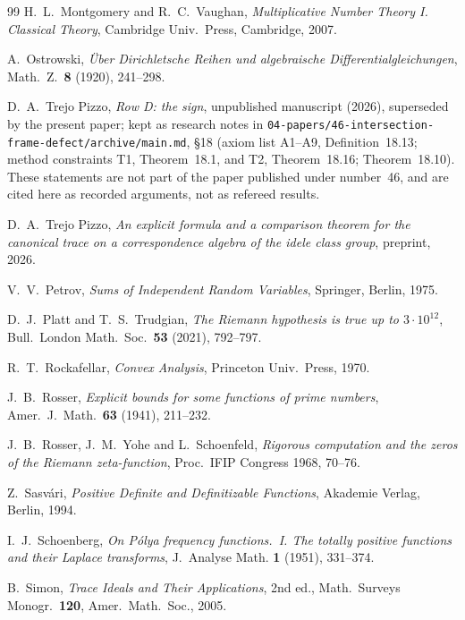 \documentclass[11pt]{amsart}
\theoremstyle{definition}
\theoremstyle{remark}
\begin{document}
\begin{thebibliography}{99}
 H.~L.~Montgomery and R.~C.~Vaughan, \emph{Multiplicative Number Theory I. Classical Theory}, Cambridge Univ.~Press, Cambridge, 2007.

 A.~Ostrowski, \emph{\"Uber Dirichletsche Reihen und algebraische Differentialgleichungen}, Math.\ Z.\ \textbf{8} (1920), 241--298.

 D.~A.~Trejo Pizzo, \emph{Row D: the sign}, unpublished manuscript (2026), superseded by the present paper; kept as research notes in \texttt{04-papers/46-intersection-frame-defect/archive/main.md}, \S18 (axiom list A1--A9, Definition~18.13; method constraints T1, Theorem~18.1, and T2, Theorem~18.16; Theorem~18.10). These statements are not part of the paper published under number~46, and are cited here as recorded arguments, not as refereed results.

 D.~A.~Trejo Pizzo, \emph{An explicit formula and a comparison theorem for the canonical trace on a correspondence
algebra of the idele class group}, preprint, 2026.

 V.~V.~Petrov, \emph{Sums of Independent Random Variables}, Springer, Berlin, 1975.

 D.~J.~Platt and T.~S.~Trudgian, \emph{The Riemann hypothesis is true up to
$3\cdot10^{12}$}, Bull.\ London Math.\ Soc.\ \textbf{53} (2021), 792--797.

 R.~T.~Rockafellar, \emph{Convex Analysis}, Princeton Univ.~Press, 1970.

 J.~B.~Rosser, \emph{Explicit bounds for some functions of prime numbers}, Amer.\ J.\
Math.\ \textbf{63} (1941), 211--232.

 J.~B.~Rosser, J.~M.~Yohe and L.~Schoenfeld, \emph{Rigorous computation and
the zeros of the Riemann zeta-function}, Proc.\ IFIP Congress 1968, 70--76.

 Z.~Sasv\'ari, \emph{Positive Definite and Definitizable Functions},
Akademie Verlag, Berlin, 1994.

 I.~J.~Schoenberg, \emph{On P\'olya frequency functions.~I. The
totally positive functions and their Laplace transforms}, J.~Analyse Math. \textbf{1} (1951), 331--374.

 B.~Simon, \emph{Trace Ideals and Their Applications}, 2nd ed., Math.\ Surveys Monogr.\ \textbf{120}, Amer.~Math.~Soc., 2005.


\end{thebibliography}
\end{document}
